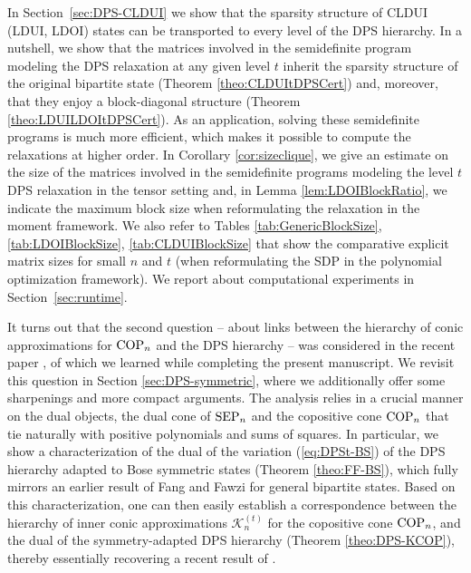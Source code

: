 \documentclass[11pt]{article}
\newcommand{\MK}{{\mathcal K}}
\newcommand{\SEP}{\text{\rm SEP}}
\newcommand{\COP}{\text{\rm COP}}
\theoremstyle{plain}
\begin{document}
In  Section~\ref{sec:DPS-CLDUI}  we show that the sparsity structure of CLDUI (LDUI, LDOI) states can be transported to every level of  the DPS hierarchy. In a nutshell, we show that the matrices involved in the semidefinite program modeling the DPS relaxation at any given  level $t$ inherit the sparsity structure of the original bipartite state (Theorem  \ref{theo:CLDUItDPSCert}) and, moreover, that they  enjoy a block-diagonal structure (Theorem \ref{theo:LDUILDOItDPSCert}).   As an application, solving these semidefinite programs is much more efficient, which makes it possible to compute the relaxations at higher order.
In Corollary \ref{cor:sizeclique},  we give an estimate on the %
 size of the matrices involved in the semidefinite programs modeling the level $t$ DPS relaxation in the tensor setting and, in Lemma \ref{lem:LDOIBlockRatio},  we indicate the maximum block size when reformulating the relaxation in the moment framework. We also refer to Tables \ref{tab:GenericBlockSize}, \ref{tab:LDOIBlockSize}, \ref{tab:CLDUIBlockSize} that show the comparative explicit matrix sizes for small $n$ and $t$ (when reformulating the SDP in the polynomial optimization framework). We report about computational experiments in  Section~\ref{sec:runtime}.
 
  
  It turns out that the second question -- about links between the hierarchy of conic approximations for $\COP_n$ and the DPS hierarchy -- was  considered  in the recent paper \cite{GNP_2025}, of which we learned while completing   the present manuscript. We revisit this question in 
Section \ref{sec:DPS-symmetric}, where we additionally offer some sharpenings and more compact arguments. The analysis relies in a crucial manner on the dual objects, the dual cone of  $\SEP_n$ and the copositive cone $\COP_n$  that tie naturally with positive polynomials and sums of squares. In particular, we show a characterization  of the dual of the variation   (\ref{eq:DPSt-BS})   of the DPS hierarchy adapted to Bose symmetric states     (Theorem \ref{theo:FF-BS}), which fully mirrors an earlier result of Fang and Fawzi \cite{FF-sphere} for general bipartite states. Based on this characterization, one can then easily establish a correspondence between the hierarchy of inner conic approximations   $\MK^{(t)}_n$   for the copositive cone $\COP_n$,  and the dual of the symmetry-adapted DPS hierarchy  (Theorem \ref{theo:DPS-KCOP}), thereby essentially recovering a recent result of \cite{GNP_2025}.
 
\end{document}
